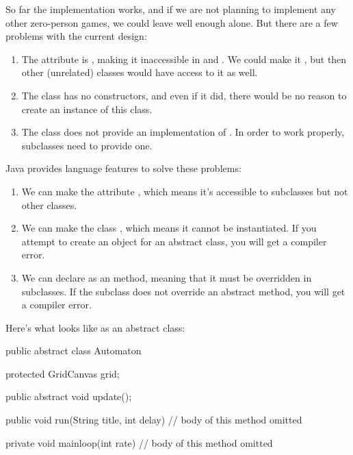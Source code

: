 So far the implementation works, and if we are not planning to implement any other zero-person games, we could leave well enough alone.
But there are a few problems with the current design:

\begin{enumerate}

\item The  attribute is , making it inaccessible in  and .
We could make it , but then other (unrelated) classes would have access to it as well.

\item The  class has no constructors, and even if it did, there would be no reason to create an instance of this class.

\item The  class does not provide an implementation of .
In order to work properly, subclasses need to provide one.

\end{enumerate}


Java provides language features to solve these problems:

\begin{enumerate}

\item We can make the  attribute , which means it's accessible to subclasses but not other classes.

\item We can make the class , which means it cannot be instantiated.
If you attempt to create an object for an abstract class, you will get a compiler error.

\item We can declare  as an  method, meaning that it must be overridden in subclasses.
If the subclass does not override an abstract method, you will get a compiler error.
\end{enumerate}

Here's what  looks like as an abstract class:

\begin{code}
public abstract class Automaton {
    protected GridCanvas grid;

    public abstract void update();

    public void run(String title, int delay) {
        // body of this method omitted
    }

    private void mainloop(int rate) {
        // body of this method omitted
    }
}
\end{code}

